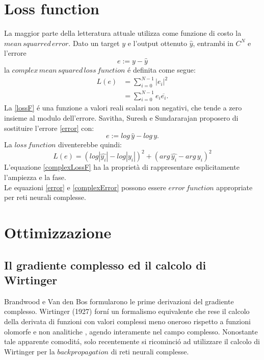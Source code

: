 \documentclass[a4paper,10pt]{article}
\begin{document}
\section{Loss function}
La maggior parte della letteratura attuale utilizza come funzione di costo la $mean \, squarred \, error$. Dato un target $y$ e l'output ottenuto $\widehat{y}$, entrambi in $C^N$ e l'errore
\begin{equation}
 e:=y-\widehat{y}\label{error}
\end{equation}
la $complex \, mean \, squared \, loss \, function$ \'e definita come segue:
\begin{align}
 L(e) &= \sum_{i=0}^{N-1} \left| e_i\right|^2\label{lossF}\\
 &=\sum_{i=0}^{N-1} e_i \overline{e_i}.
\end{align}
La \eqref{lossF} \'e una funzione a valori reali scalari non negativi, che tende a zero insieme al modulo dell'errore. Savitha, Suresh e Sundararajan proposero di sostituire l'errore \eqref{error} con:
\begin{equation}
 e:=log \, \widehat{y} - log \, y.\label{complexError}
\end{equation}
La $loss \, function$ diventerebbe quindi:
\begin{equation}
 L(e)=\left( log\left| \widehat{y_i}\right|-log\left| y_i\right|\right)^2 + \left(arg \, \widehat{y_i} - arg \, y_i\right)^2\label{complexLossF}
\end{equation}
L'equazione \eqref{complexLossF} ha la proprietà di rappresentare esplicitamente l'ampiezza e la fase. \\
Le equazioni \eqref{error} e \eqref{complexError} possono essere $error \, function$ appropriate per reti neurali complesse.

\section{Ottimizzazione}
\subsection{Il gradiente complesso ed il calcolo di Wirtinger}
Brandwood e Van den Bos formularono le prime derivazioni del gradiente complesso. Wirtinger (1927) forn\'i un formalismo equivalente che rese il calcolo della derivata di funzioni con valori complessi meno oneroso rispetto a funzioni olomorfe e non analitiche , agendo interamente nel campo complesso. Nonostante tale apparente comodit\'a, solo recentemente si ricominci\'o ad utilizzare il calcolo di Wirtinger per la $backpropagation$ di reti neurali complesse. 
\end{document}
